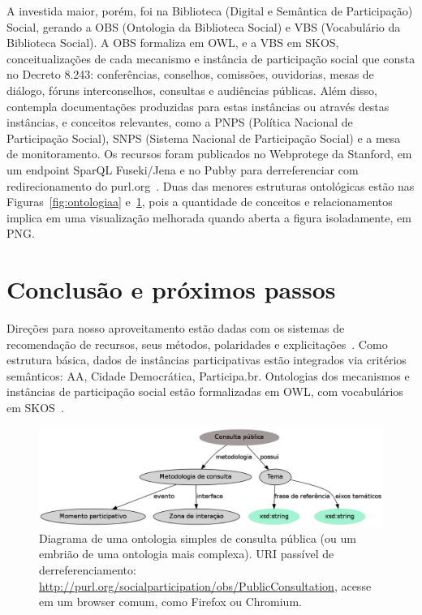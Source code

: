 \documentclass[a4paper, 11pt]{article} %
\begin{document}
A investida maior, porém, foi na Biblioteca (Digital e Semântica de Participação) Social, gerando a OBS (Ontologia da Biblioteca Social) e VBS (Vocabulário da Biblioteca Social). A OBS formaliza em OWL, e a VBS em SKOS, conceitualizações de cada mecanismo e instância de participação social que consta no Decreto 8.243: conferências, conselhos, comissões, ouvidorias, mesas de diálogo, fóruns interconselhos, consultas e audiências públicas. Além disso, contempla documentações produzidas para estas instâncias ou através destas instâncias, e conceitos relevantes, como a PNPS (Política Nacional de Participação Social), SNPS (Sistema Nacional de Participação Social) e a mesa de monitoramento. Os recursos foram publicados no Webprotege da Stanford, em um endpoint SparQL Fuseki/Jena e no Pubby para derreferenciar com redirecionamento do purl.org~\cite{pnud5}. Duas das menores estruturas ontológicas estão nas Figuras~\ref{fig:ontologiaa} e~\ref{fig:consulta}, pois a quantidade de conceitos e relacionamentos implica em uma visualização melhorada quando aberta a figura isoladamente, em PNG.


\section*{Conclusão e próximos passos}

Direções para nosso aproveitamento estão dadas com os sistemas de recomendação de recursos, seus métodos, polaridades e explicitações~\cite{pnud4}. Como estrutura básica, dados de instâncias participativas estão integrados via critérios semânticos: AA, Cidade Democrática, Participa.br. Ontologias dos mecanismos e instâncias de participação social estão formalizadas em OWL, com vocabulários em SKOS~\cite{pnud5}.
\begin{figure}[H]
  \centering
    \includegraphics[width=1.\textwidth]{obsConsulta.png}
  \caption{\small Diagrama de uma ontologia simples de consulta pública (ou um embrião de uma ontologia mais complexa). URI passível de derreferenciamento: \url{http://purl.org/socialparticipation/obs/PublicConsultation}, acesse em um browser comum, como Firefox ou Chromium.}\label{fig:consulta}
\end{figure}
\end{document}
